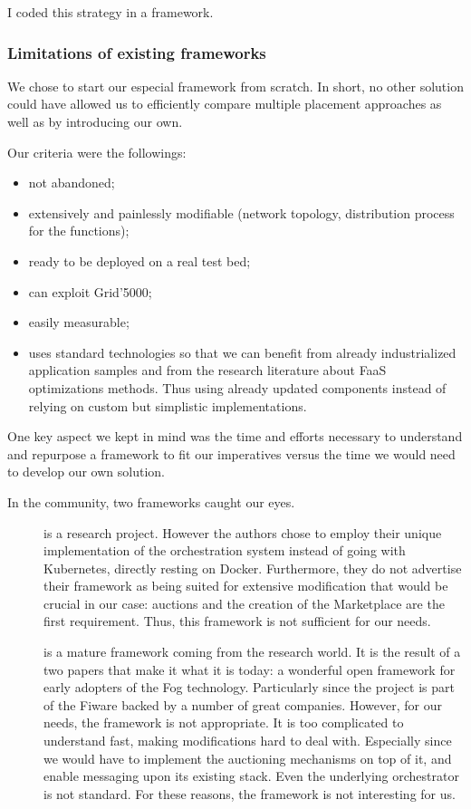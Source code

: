 I coded this strategy in a framework.

\subsubsection{Limitations of existing frameworks}

We chose to start our especial framework from scratch. In short, no other solution could have allowed us to efficiently compare multiple placement approaches as well as by introducing our own.

Our criteria were the followings:
\begin{itemize}
	\item not abandoned;
	\item extensively and painlessly modifiable (network topology, distribution process for the functions);
	\item ready to be deployed on a real test bed;
	\item can exploit Grid'5000;
	\item easily measurable;
	\item uses standard technologies so that we can benefit from already industrialized application samples and from the research literature about \gls{FaaS} optimizations methods. Thus using already updated components instead of relying on custom but simplistic implementations.
\end{itemize}

One key aspect we kept in mind was the time and efforts necessary to understand and repurpose a framework to fit our imperatives versus the time we would need to develop our own solution.

In the community, two frameworks caught our eyes.
\begin{description}
	\item[\cite{deng_fogbus2_2021}]{is a research project. However the authors chose to employ their unique implementation of the orchestration system instead of going with Kubernetes, directly resting on Docker. Furthermore, they do not advertise their framework as being suited for extensive modification that would be crucial in our case: auctions and the creation of the Marketplace are the first requirement. Thus, this framework is not sufficient for our needs.
	}
	\item[\cite{smartfog_fogflow_2022}]{ is a mature framework coming from the research world. It is the result of a two papers \cite{cheng_fogflow_2018, cheng_fog_2019} that make it what it is today: a wonderful open framework for early adopters of the Fog technology. Particularly since the project is part of the Fiware \cite{fiware_foundation_fiware_2021} backed by a number of great companies. However, for our needs, the framework is not appropriate. It is too complicated to understand fast, making modifications hard to deal with. Especially since we would have to implement the auctioning mechanisms on top of it, and enable messaging upon its existing stack. Even the underlying orchestrator is not standard. For these reasons, the framework is not interesting for us.}
\end{description}

